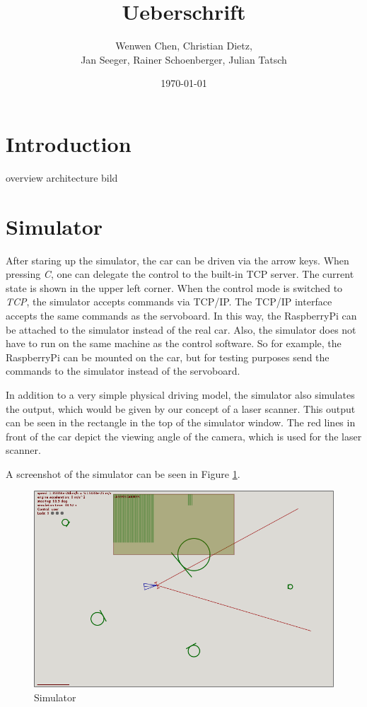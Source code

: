 \documentclass[a4paper
               ,10pt
               ,DIV=10 %
               ,BCOR=0.3cm
               ,pagesize %
               ,headings=small
               ,bibtotoc
               ]
               {scrartcl}
\title{Ueberschrift}%
\author{Wenwen Chen, Christian Dietz, \\
	Jan Seeger, Rainer Schoenberger, Julian Tatsch
}
\date{\today}
\begin{document}
\maketitle

\begin{abstract}
\end{abstract}

\section{Introduction}

overview
architecture bild

\section{Simulator}


After staring up the simulator, the car can be driven via the arrow keys. When pressing \textit{C}, one can delegate the control to the built-in TCP server. The current state is shown in the upper left corner.
When the control mode is switched to \textit{TCP}, the simulator accepts commands via TCP/IP.
The TCP/IP interface accepts the same commands as the servoboard.
In this way, the RaspberryPi can be attached to the simulator instead of the real car.
Also, the simulator does not have to run on the same machine as the control software.
So for example, the RaspberryPi can be mounted on the car, but for testing purposes send the commands to the simulator instead of the servoboard.

In addition to a very simple physical driving model, the simulator also simulates the output, which would be given by our concept of a laser scanner. This output can be seen in the rectangle in the top of the simulator window. The red lines in front of the car depict the viewing angle of the camera, which is used for the laser scanner.

A screenshot of the simulator can be seen in Figure \ref{figsim}.

\begin{figure}[H]
\begin{center}
\includegraphics[width=15cm]{pic/sim.png}
\caption{Simulator}
\end{center}
\label{figsim}
\end{figure}
\end{document}
